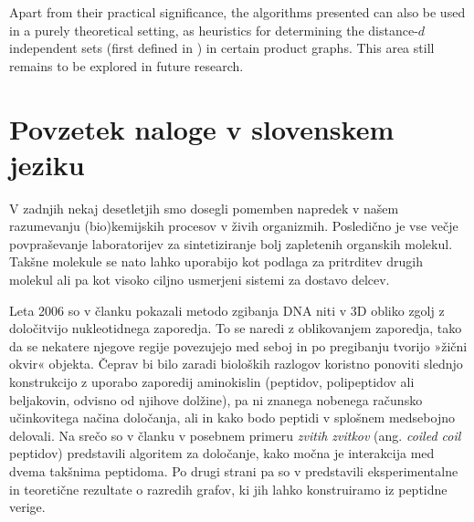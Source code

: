 \documentclass[12pt,a4paper,titlepage,openany]{report}
\begin{document}
Apart from their practical significance, the algorithms presented can also be used in a purely theoretical setting, as heuristics for determining the distance-$d$ independent sets (first defined in \cite{agnarsson2003powers}) in certain product graphs. This area still remains to be explored in future research.


\chapter{Povzetek naloge v slovenskem jeziku}
\thispagestyle{fancy}

V zadnjih nekaj desetletjih smo  dosegli pomemben napredek v našem razumevanju (bio)kemijskih procesov v živih organizmih. Posledično je vse večje  povpraševanje laboratorijev za sintetiziranje bolj zapletenih organskih molekul. Takšne molekule se nato lahko uporabijo kot podlaga za pritrditev drugih molekul ali pa kot visoko ciljno usmerjeni sistemi za dostavo delcev.

Leta 2006 so v članku \cite{rothemund2006folding} pokazali metodo zgibanja  DNA niti v 3D obliko zgolj z določitvijo nukleotidnega zaporedja. To se naredi z oblikovanjem zaporedja, tako da se nekatere njegove regije povezujejo med seboj in  po pregibanju tvorijo »žični okvir« objekta. Čeprav bi bilo zaradi bioloških razlogov koristno ponoviti slednjo  konstrukcijo z uporabo zaporedij aminokislin (peptidov, polipeptidov ali beljakovin,
odvisno od njihove dolžine), pa ni znanega nobenega računsko učinkovitega načina določanja,
ali in kako bodo peptidi v splošnem medsebojno delovali. Na srečo so  v članku \cite{potapov2015data} v posebnem primeru \emph{zvitih zvitkov} 
(ang. \emph{coiled coil} peptidov) predstavili algoritem za določanje, kako močna je interakcija med dvema takšnima peptidoma. Po drugi strani pa so v \cite{gradivsar2013design} predstavili eksperimentalne in teoretične rezultate o razredih grafov, ki jih lahko konstruiramo iz peptidne verige.
\end{document}
